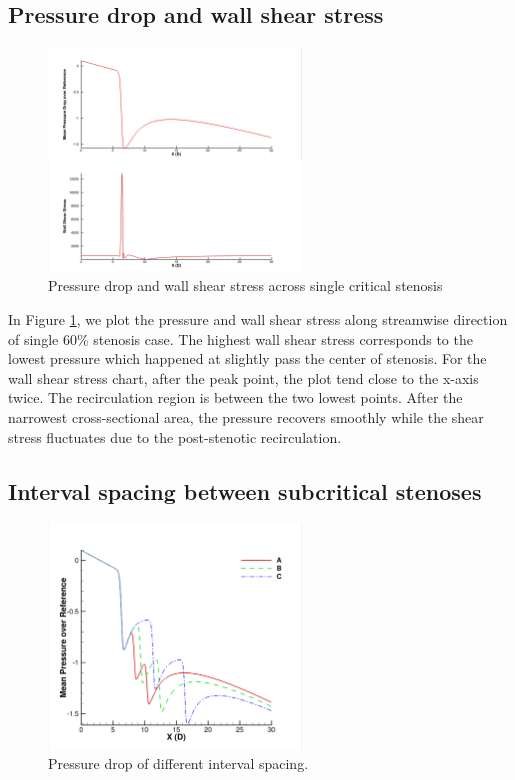 \subsection{Pressure drop and wall shear stress}
\begin{figure}[H]
	\centering
	\includegraphics[trim= 1mm 0mm 1mm 0mm,clip,width=0.60\textwidth]{./pics/pandws.png}
	\caption{Pressure drop and wall shear stress across single critical stenosis}
	\label{fig:pandws}
\end{figure}

In Figure \ref{fig:pandws}, we plot the pressure and wall shear stress along streamwise direction of single 60\% stenosis case.
The highest wall shear stress corresponds to the lowest pressure which happened at slightly pass the center of stenosis.
For the wall shear stress chart, after the peak point, the plot tend close to the x-axis twice. 
The recirculation region is between the two lowest points.
After the narrowest cross-sectional area, the pressure recovers smoothly while the shear stress fluctuates due to the post-stenotic recirculation.


\subsection{Interval spacing between subcritical stenoses}

\begin{figure}[H]
	\centering
	\includegraphics[trim= 1mm 0mm 1mm 0mm,clip,width=0.60\textwidth]{./pics/interval.png}
	\caption{Pressure drop of different interval spacing.}
	\label{fig:Pressure drop of different interval spacing}
\end{figure}

